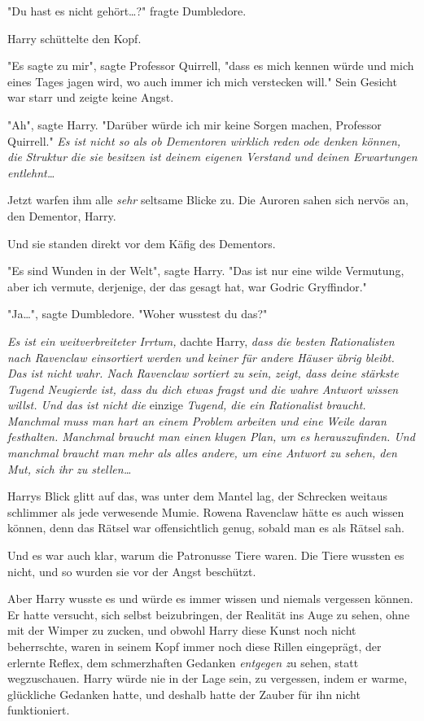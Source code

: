 {"Du hast es nicht gehört…?" fragte Dumbledore.

Harry schüttelte den Kopf.

"Es sagte zu mir", sagte Professor Quirrell, "dass es mich kennen würde und mich eines Tages jagen wird, wo auch immer ich mich verstecken will." Sein Gesicht war starr und zeigte keine Angst.

"Ah", sagte Harry. "Darüber würde ich mir keine Sorgen machen, Professor Quirrell." \emph{Es ist nicht so als ob Dementoren wirklich reden} \emph{ode} \emph{denken können, die} \emph{Struktur} \emph{die sie besitzen ist deinem eigenen Verstand und deinen Erwartungen entlehnt…}

Jetzt warfen ihm alle \emph{sehr} seltsame Blicke zu. Die Auroren sahen sich nervös an, den Dementor, Harry.

Und sie standen direkt vor dem Käfig des Dementors.

"Es sind Wunden in der Welt", sagte Harry. "Das ist nur eine wilde Vermutung, aber ich vermute, derjenige, der das gesagt hat, war Godric Gryffindor."

"Ja…", sagte Dumbledore. "Woher wusstest du das?"

\emph{Es ist ein weitverbreiteter Irrtum,} dachte Harry, \emph{dass die besten Rationalisten nach Ravenclaw einsortiert werden und keiner für andere Häuser} \emph{übrig bleibt. Das ist nicht wahr. Nach Ravenclaw sortiert zu sein, zeigt, dass deine stärkste Tugend Neugierde ist, dass du dich etwas fragst und die wahre Antwort wissen willst. Und das ist nicht die} einzige \emph{Tugend, die ein Rationalist braucht. Manchmal muss man hart an einem Problem arbeiten und eine Weile daran festhalten. Manchmal braucht man einen klugen Plan, um es herauszufinden. Und manchmal braucht man mehr als alles andere, um eine Antwort zu sehen, den Mut, sich ihr zu stellen…}

Harrys Blick glitt auf das, was unter dem Mantel lag, der Schrecken weitaus schlimmer als jede verwesende Mumie. Rowena Ravenclaw hätte es auch wissen können, denn das Rätsel war offensichtlich genug, sobald man es als Rätsel sah.

Und es war auch klar, warum die Patronusse Tiere waren. Die Tiere wussten es nicht, und so wurden sie vor der Angst beschützt.

Aber Harry wusste es und würde es immer wissen und niemals vergessen können. Er hatte versucht, sich selbst beizubringen, der Realität ins Auge zu sehen, ohne mit der Wimper zu zucken, und obwohl Harry diese Kunst noch nicht beherrschte, waren in seinem Kopf immer noch diese Rillen eingeprägt, der erlernte Reflex, dem schmerzhaften Gedanken \emph{entgegen z}u sehen, statt wegzuschauen. Harry würde nie in der Lage sein, zu vergessen, indem er warme, glückliche Gedanken hatte, und deshalb hatte der Zauber für ihn nicht funktioniert.

}
